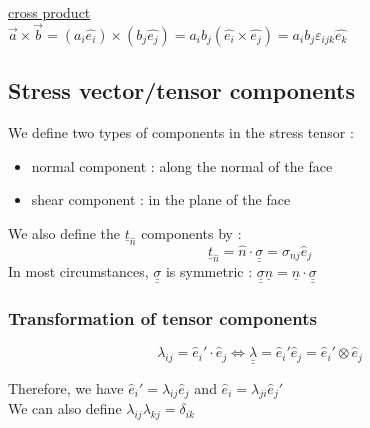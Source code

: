 \documentclass[../main.tex]{subfiles}
\begin{document}
\quad \underline{cross product}\\
$\Vec{a}\times \Vec{b} = (a_i \hat{e_i}) \times (b_j \hat{e_j}) = a_ib_j (\hat{e_i} \times \hat{e_j}) = a_ib_j \varepsilon_{ijk} \hat{e_k}$\\

\subsection{Stress vector/tensor components}
We define two types of components in the stress tensor : \\
\begin{itemize}
    \item normal component : along the normal of the face\\
    \item shear component : in the plane of the face\\
\end{itemize}

We also define the $\underline{t}_{\hat{n}}$ components by : \\
\begin{equation}
    \underline{t}_{\hat{n}} = \hat{n} \cdot \underline{\underline{\sigma}} = \sigma_{nj}\hat{e}_j
\end{equation}
In most circumstances, $\underline{\underline{\sigma}}$ is symmetric : $\underline{\underline{\sigma}} \underline{n} = \underline{n}\cdot \underline{\underline{\sigma}}$\\

\subsubsection{Transformation of tensor components}
\begin{equation}
    \lambda_{ij} = \hat{e}_i' \cdot \hat{e}_j \Leftrightarrow \underline{\underline{\lambda}} = \hat{e}_i' \hat{e}_j = \hat{e}_i' \otimes \hat{e}_j
\end{equation}

Therefore, we have $\hat{e}_i' = \lambda_{ij} \hat{e}_j$ and $\hat{e}_i = \lambda_{ji} \hat{e}_j'$\\

We can also define $\lambda_{ij} \lambda_{kj} = \delta_{ik}$\\
\end{document}
